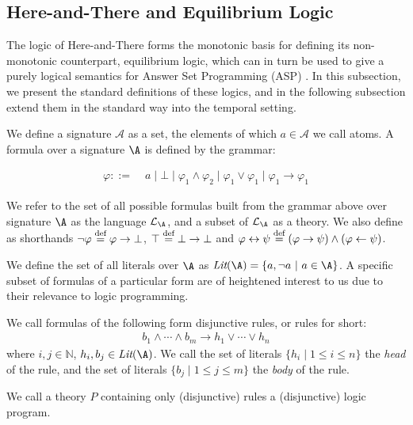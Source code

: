 \subsection{Here-and-There and Equilibrium Logic}

The logic of Here-and-There forms the monotonic basis for defining
its non-monotonic counterpart, equilibrium logic, which can in turn
be used to give a purely logical semantics for Answer Set Programming
(ASP) \cite{pearce06a}. In this subsection, we present the standard
definitions of these logics, and in the following subsection extend
them in the standard way into the temporal setting.

We define a signature $\mathcal{A}$ as a set, the elements of which $a\in \mathcal{A}$ we
call atoms. A formula over a signature $\A$ is defined by the grammar:

\begin{align*}
    \varphi ::= &\; a \mid \bot \mid
                  \varphi_1 \wedge \varphi_2 \mid
                  \varphi_1 \vee \varphi_1 \mid
                  \varphi_1 \to \varphi_1
\end{align*}

We refer to the set of all possible formulas built from the grammar
above over signature $\A$ as the language $\langa$, and a
subset of $\langa$ as a theory.  We also define as shorthands
$\neg \varphi \stackrel{\text{def}}{=} \varphi \to \bot$, $\top \stackrel{\text{def}}{=} \bot \to \bot$
and
$\varphi \leftrightarrow \psi \stackrel{\text{def}}{=} (\varphi \rightarrow \psi) \wedge
(\varphi \leftarrow \psi)$.

We define the set of all literals over $\A$ as
$\textit{Lit}(\A) = \{ a, \lnot a\ |\ a \in \A \}$.  A specific subset
of formulas of a particular form are of heightened interest to us due
to their relevance to logic programming.

\begin{definition}
    We call formulas of the following form disjunctive rules, or rules for short:
\begin{align*}
  b_{1} \wedge \cdots \wedge b_{m} \rightarrow h_1 \vee \cdots \vee h_{n}
\end{align*}
where $i,j \in \mathbb{N}$, $h_{i}, b_{j} \in \textit{Lit}(\A)$. We
call the set of literals $\{ h_i \mid 1 \leq i \leq n \}$ the
\emph{head} of the rule, and the set of literals
$\{ b_j \mid 1 \leq j \leq m \}$ the \emph{body} of the rule.
\end{definition}

We call a theory $P$ containing only (disjunctive) rules a
(disjunctive) logic program.

